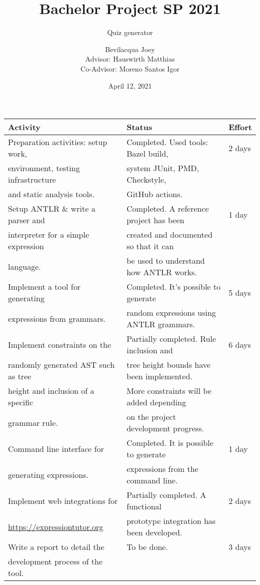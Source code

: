 \documentclass[t,aspectratio=43]{beamer}
\title{Bachelor Project SP 2021}
\subtitle{Quiz generator}
\author{Bevilacqua Joey\\Advisor: Hauswirth Matthias\\Co-Advisor: Moreno Santos Igor}
\institute{Universit\`a della Svizzera Italiana}
\date{April 12, 2021}
\begin{document}
\begin{frame}
\maketitle
\end{frame}

\begin{frame}
\begin{center}
\begin{tabular}{lll}
\textbf{Activity}                   & \textbf{Status}                           & \textbf{Effort} \\\hline
Preparation activities: setup work, & Completed. Used tools: Bazel build,       & 2 days          \\
environment, testing infrastructure & system JUnit, PMD, Checkstyle,            &                 \\
and static analysis tools.          & GitHub actions.                           &                 \\\hline
Setup ANTLR \& write a parser and   & Completed. A reference project has been   & 1 day           \\
interpreter for a simple expression & created and documented so that it can     &                 \\
language.                           & be used to understand how ANTLR works.    &                 \\\hline
Implement a tool for generating     & Completed. It's possible to generate      & 5 days          \\
expressions from grammars.          & random expressions using ANTLR grammars.  &                 \\\hline
Implement constraints on the        & Partially completed. Rule inclusion and   & 6 days          \\
randomly generated AST such as tree & tree height bounds have been implemented. &                 \\
height and inclusion of a specific  & More constraints will be added depending  &                 \\
grammar rule.                       & on the project development progress.      &                 \\\hline
Command line interface for          & Completed. It is possible to generate     & 1 day           \\
generating expressions.             & expressions from the command line.        &                 \\\hline
Implement web integrations for      & Partially completed. A functional         & 2 days          \\
\url{https://expressiontutor.org}   & prototype integration has been developed. &                 \\\hline
Write a report to detail the        & To be done.                               & 3 days          \\
development process of the tool.    &                                           &                 \\\hline
\end{tabular}
\end{center}
\end{frame}
\end{document}
